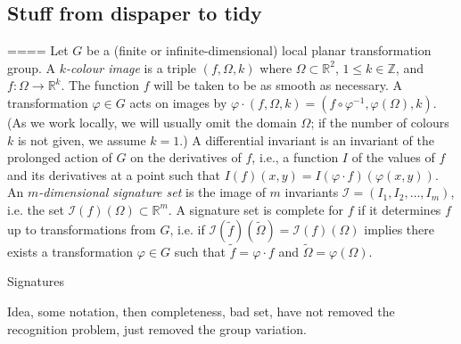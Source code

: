 \documentclass[review,onefignum,onetabnum]{siamonline190516}
\def\R{\mathbb{R}}
\begin{document}
\subsection{Stuff from dispaper to tidy}
====
Let $G$ be a (finite or infinite-dimensional) local planar transformation
group.  A {\em $k$-colour image} is a triple $(f,\Omega,k)$ where
$\Omega\subset\R^2$, $1\le k\in\mathbb{Z}$, and $f\colon\Omega\to\R^k$. The
function $f$ will be taken to be as smooth as necessary.  A transformation
$\varphi\in G$ acts on images by $\varphi\cdot (f,\Omega,k) =
(f\circ\varphi^{-1},\varphi(\Omega),k)$.  (As we work locally, we will
usually omit the domain $\Omega$; if the number of colours $k$ is not
given, we assume $k=1$.)  A differential invariant is an invariant of the
prolonged action of $G$ on the derivatives of $f$, i.e., a function $I$ of
the values of $f$ and its derivatives at a point such that $I(f)(x,y) =
I(\varphi\cdot f)(\varphi(x,y))$. An {\em $m$-dimensional signature set} is
the image of $m$ invariants $\mathcal{I}=(I_1,I_2,\dots,I_m)$, i.e. the set
$\mathcal{I}(f)(\Omega)\subset \mathbb{R}^m$.  A signature set is complete
for $f$ if it determines $f$ up to transformations from $G$, i.e. if
$\mathcal{I}(\tilde f)(\tilde\Omega) = \mathcal{I}(f)(\Omega)$ implies
there exists a transformation $\varphi\in G$ such that $\tilde f =
\varphi\cdot f$ and $\tilde \Omega = \varphi(\Omega)$.

Signatures

Idea, some notation, then completeness, bad set, have not removed the recognition problem, just removed the group variation.
\end{document}
